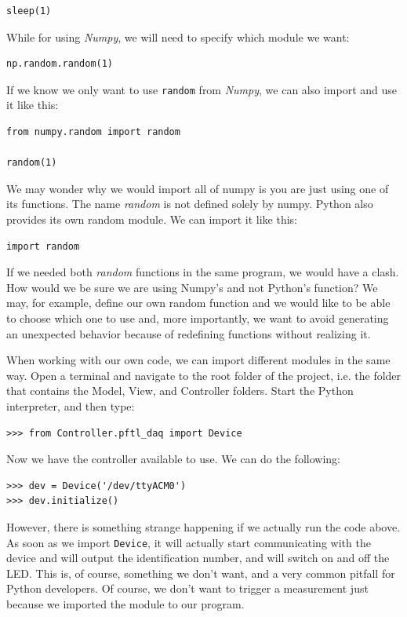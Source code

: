 \begin{verbatim}
sleep(1)
\end{verbatim}

While for using \emph{Numpy}, we will need to specify which module we want:

\begin{verbatim}
np.random.random(1)
\end{verbatim}

If we know we only want to use \texttt{random} from \emph{Numpy}, we can also import and use it like this:

\begin{verbatim}
from numpy.random import random

random(1)
\end{verbatim}

We may wonder why we would import all of numpy is you are just using one of its functions. The name \emph{random} is not defined solely by numpy. Python also provides its own random module. We can import it like this:

\begin{verbatim}
import random
\end{verbatim}

If we needed both \emph{random} functions in the same program, we would have a clash. How would we be sure we are using Numpy's and not Python's function? We may, for example, define our own random function and we would like to be able to choose which one to use and, more importantly, we want to avoid generating an unexpected behavior because of redefining functions without realizing it.

When working with our own code, we can import different modules in the same way. Open a terminal and navigate to the root folder of the project, i.e. the folder that contains the Model, View, and Controller folders. Start the Python interpreter, and then type:

\begin{verbatim}
>>> from Controller.pftl_daq import Device
\end{verbatim}

Now we have the controller available to use. We can do the following:

\begin{verbatim}
>>> dev = Device('/dev/ttyACM0')
>>> dev.initialize()
\end{verbatim}

However, there is something strange happening if we actually run the code above. As soon as we import \texttt{Device}, it will actually start communicating with the device and will output the identification number, and will switch on and off the LED. This is, of course, something we don't want, and a very common pitfall for Python developers. Of course, we don't want to trigger a measurement just because we imported the module to our program.

